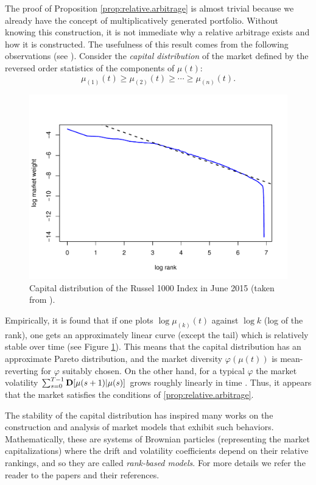 \documentclass[graybox]{svmult}
\begin{document}
The proof of Proposition \ref{prop:relative.arbitrage} is almost trivial because we already have the concept of multiplicatively generated portfolio. Without knowing this construction, it is not immediate why a relative arbitrage exists and how it is constructed. The usefulness of this result comes from the following observations (see \cite{F02}). Consider the {\it capital distribution} of the market defined by the reversed order statistics of the components of $\mu(t)$:
\[
\mu_{(1)}(t) \geq \mu_{(2)}(t) \geq \cdots \geq \mu_{(n)}(t).
\]
\begin{figure}[t!]
\centering
\includegraphics[scale=0.42]{capdist.pdf}
\caption{Capital distribution of the Russel 1000 Index in June 2015 (taken from \cite{P16}).} \label{fig:capdist}
\end{figure}
Empirically, it is found that if one plots $\log \mu_{(k)}(t)$ against $\log k$ (log of the rank), one gets an approximately linear curve (except the tail) which is relatively stable over time (see Figure \ref{fig:capdist}). This means that the capital distribution has an approximate Pareto distribution, and the market diversity $\varphi(\mu(t))$ is mean-reverting for $\varphi$ suitably chosen. On the other hand, for a typical $\varphi$ the market volatility $\sum_{s =0}^{T - 1} {\bf D} [ \mu(s + 1) | \mu(s) ]$ grows roughly linearly in time \cite{FK05}. Thus, it appears that the market satisfies the conditions of \eqref{prop:relative.arbitrage}.

The stability of the capital distribution has inspired many works on the construction and analysis of market models that exhibit such behaviors. Mathematically, these are systems of Brownian particles (representing the market capitalizations) where the drift and volatility coefficients depend on their relative rankings, and so they are called {\it rank-based models}. For more details we refer the reader to the papers \cite{BFK05, IPBKF11, P11, IPS13, FIK13, JR15, DT17} and their references.
\end{document}
